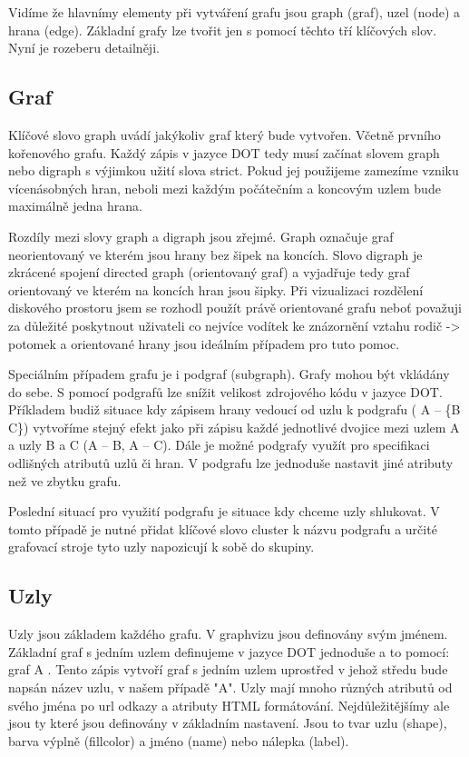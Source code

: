 \documentclass[color,table,oneside,nolot,nolof]{fithesis}
\begin{document}
	Vidíme že hlavnímy elementy při vytváření grafu jsou graph (graf), uzel (node) a hrana (edge). Základní grafy lze tvořit jen s pomocí těchto tří klíčových slov. Nyní je rozeberu detailněji.

\subsection{Graf}
	Klíčové slovo graph uvádí jakýkoliv graf který bude vytvořen. Včetně prvního kořenového grafu. Každý zápis v jazyce DOT tedy musí začínat slovem graph nebo digraph s výjimkou užití slova
	strict. Pokud jej použijeme zamezíme vzniku vícenásobných hran, neboli mezi každým počátečním a koncovým uzlem bude maximálně jedna hrana. 

	Rozdíly mezi slovy graph a digraph jsou zřejmé. Graph označuje graf neorientovaný ve kterém jsou hrany bez šipek na koncích. Slovo digraph je zkrácené spojení directed graph (orientovaný
	graf) a vyjadřuje tedy graf orientovaný ve kterém na koncích hran jsou šipky. Při vizualizaci rozdělení diskového prostoru jsem se rozhodl použít právě orientované grafu neboť považuji za 
	důležité poskytnout uživateli co nejvíce vodítek ke znázornění vztahu rodič -> potomek a orientované hrany jsou ideálním případem pro tuto pomoc. 

	Speciálním případem grafu je i podgraf (subgraph). Grafy mohou být vkládány do sebe. S pomocí podgrafů lze snížit velikost zdrojového kódu v jazyce DOT. Příkladem budiž situace kdy zápisem
	hrany vedoucí od uzlu k podgrafu ( A -- \{B C\}) vytvoříme stejný efekt jako při zápisu každé jednotlivé dvojice mezi uzlem A a uzly B a C (A -- B, A -- C). Dále je možné podgrafy využít
	pro specifikaci odlišných atributů uzlů či hran. V podgrafu lze jednoduše nastavit jiné atributy než ve zbytku grafu.

	Poslední situací pro využití podgrafu je situace kdy chceme uzly shlukovat. V tomto případě je nutné přidat klíčové slovo cluster k názvu podgrafu a určité grafovací stroje tyto uzly 
	napozicují k sobě do skupiny.

\subsection{Uzly}
	Uzly jsou základem každého grafu. V graphvizu jsou definovány svým jménem. Základní graf s jedním uzlem definujeme v jazyce DOT jednoduše a to pomocí: graf { A }. Tento zápis vytvoří
	graf s jedním uzlem uprostřed v jehož středu bude napsán název uzlu, v našem případě "A". Uzly mají mnoho různých atributů od svého jména po url odkazy a atributy HTML formátování. 
	Nejdůležitějšímy ale jsou ty které jsou definovány v základním nastavení. Jsou to tvar uzlu (shape), barva výplně (fillcolor) a jméno (name) nebo nálepka (label). 
	
\end{document}
